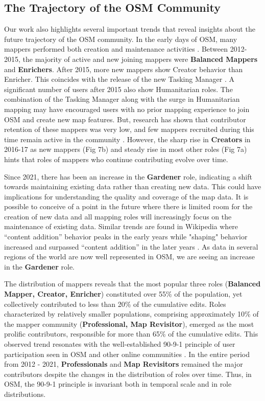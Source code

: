\documentclass[manuscript,screen,review]{acmart}
\begin{document}
\subsection{The Trajectory of the OSM Community}

Our work also highlights several important trends that reveal insights about the future trajectory of the OSM community. In the early days of OSM, many mappers performed both creation and maintenance activities \cite{Palen15}. Between 2012-2015, the majority of active and new joining mappers were \textbf{Balanced Mappers} and \textbf{Enrichers}. After 2015, more new mappers show Creator behavior than Enricher. This coincides with the release of the new Tasking Manager \cite{palen15,herfort2021evolution}. A significant number of users after 2015 also show Humanitarian roles. The combination of the Tasking Manager along with the surge in Humanitarian mapping may have encouraged users with no prior mapping experience to join OSM and create new map features. But, research has shown that contributor retention of these mappers was very low, and few mappers recruited during this time remain active in the community \cite{Mahmud22}. However, the sharp rise in \textbf{Creators} in 2016-17 as new mappers (Fig 7b) and steady rise in most other roles (Fig 7a) hints that roles of mappers who continue contributing evolve over time.
 
Since 2021, there has been an increase in the \textbf{Gardener} role, indicating a shift towards maintaining existing data rather than creating new data. This could have implications for understanding the quality and coverage of the map data. It is possible to conceive of a point in the future where there is limited room for the creation of new data and all mapping roles will increasingly focus on the maintenance of existing data. Similar trends are found in Wikipedia where “content addition” behavior peaks in the early years while "shaping" behavior increased and surpassed “content addition” in the later years \cite{Arazy20}. As data in several regions of the world are now well represented in OSM\cite{herfort2021evolution}, we are seeing an increase in the \textbf{Gardener} role.
 
The distribution of mappers reveals that the most popular three roles (\textbf{Balanced Mapper, Creator, Enricher}) constituted over 55\% of the population, yet collectively contributed to less than 20\% of the cumulative edits. Roles characterized by relatively smaller populations, comprising approximately 10\% of the mapper community (\textbf{Professional, Map Revisitor}), emerged as the most prolific contributors, responsible for more than 65\% of the cumulative edits. This observed trend resonates with the well-established 90-9-1 principle of user participation seen in OSM and other online communities \cite{BeginDR18, Yamashita15}. In the entire period from 2012 - 2021, \textbf{Professionals} and \textbf{Map Revisitors} remained the major contributors despite the changes in the distribution of roles over time. Thus, in OSM, the 90-9-1 principle is invariant both in temporal scale and in role distributions.
 
\end{document}
